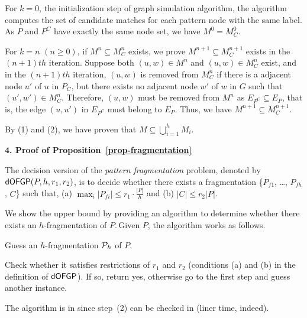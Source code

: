 \vspace{-1.8ex}
 For $k=0$, \ie the initialization step of graph simulation algorithm,
the algorithm computes the set of candidate matches for each pattern node with the same label.
As $P$ and $P^{C}$ have exactly the same node set, we have $M^{0}= M_{C}^{0}$.

\vspace{-1.8ex}
 For $k=n$ $(n\geq 0)$, if $M^{n}\subseteq M_{C}^{n}$ exists, we prove $M^{n+1}\subseteq M_{C}^{n+1}$ exists in the $(n+1)th$ iteration.
Suppose both $(u,w)\in M^{n}$ and $(u,w)\in M_{C}^{n}$ exist,
and in the $(n+1)th$ iteration, $(u,w)$ is removed from $M_{C}^{n}$ if there is a adjacent node $u'$ of $u$ in $P_{C}$,
but there exists no adjacent node $w'$ of $w$ in $G$ such that $(u',w')\in M_{C}^{n}$.
Therefore, $(u,w)$ must be removed from $M^{n}$ as $E_{P^{C}} \subseteq E_{P}$,
that is, the edge $(u,u')$ in $E_{P^{C}}$ must belong to $E_{P}$.
Thus, we have $M^{n+1}\subseteq M_{C}^{n+1}$.

\vspace{-1.5ex}
By (1) and (2), we have proven that $M\subseteq\bigcup_{i=1}^{h}M_{i}$.


\noindent
{\textbf{4. Proof of Proposition~\ref{prop-fragmentation}}}

The decision version of the {\em pattern fragmentation} problem, denoted by ${\mathsf{dOFGP}}(P, h, r_1, r_2)$,
is to decide whether there exists a fragmentation \{${P}_{f1}$, \ldots, $P_{fh}$, $C$\} such that,
(a) $\max_i |P_{fi}| \leq r_1\cdot\frac{|P|}{h}$ and (b) $|C|\leq r_2|P|$.

\vspace{-2ex}
 We show the \NP upper bound by providing an \NP algorithm to determine whether there exists an $h$-fragmentation of $P$.\,Given $P$, the algorithm works as follows.

\vspace{-1.8ex}
 Guess an $h$-fragmentation ${\cal P}_h$ of $P$.

\vspace{-1.8ex}
 Check whether it satisfies restrictions of $r_1$ and $r_2$ (conditions (a) and (b) in the definition of ${\mathsf{dOFGP}}$).
If so, return yes, otherwise go to the first step and guess another instance.

\vspace{-1.5ex}
The algorithm is in \NP since step~(2) can be checked in \PTIME (liner time, indeed).

